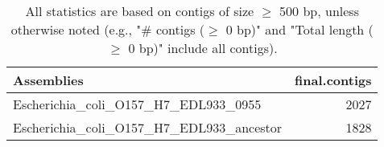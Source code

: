 \documentclass[12pt,a4paper]{article}
\begin{document}
\begin{table}[ht]
\begin{center}
\caption{All statistics are based on contigs of size $\geq$ 500 bp, unless otherwise noted (e.g., "\# contigs ($\geq$ 0 bp)" and "Total length ($\geq$ 0 bp)" include all contigs).}
\begin{tabular}{|l*{1}{|r}|}
\hline
Assemblies & final.contigs \\ \hline
Escherichia\_coli\_O157\_H7\_EDL933\_0955 & 2027 \\ \hline
Escherichia\_coli\_O157\_H7\_EDL933\_ancestor & 1828 \\ \hline
\end{tabular}
\end{center}
\end{table}
\end{document}
